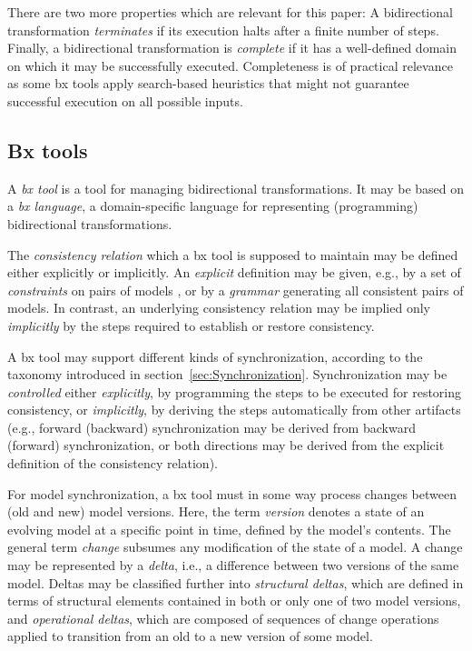 There are two more properties which are relevant for this paper: A bidirectional transformation \emph{terminates} if its execution halts after a finite number of steps. 
Finally, a bidirectional transformation is \emph{complete} if it has a well-defined domain on which it may be successfully executed.
Completeness is of practical relevance as some bx tools apply search-based heuristics that might not guarantee successful execution on all possible inputs.

\subsection{Bx tools}
\label{sec:BxTools}

A \emph{bx tool} is a tool for managing bidirectional transformations. It may be based on a \emph{bx language}, a domain-specific language for representing (programming) bidirectional transformations. 

The \emph{consistency relation} which a bx tool is supposed to maintain may be defined either explicitly or implicitly. An \emph{explicit} definition may be given, e.g., by a set of \emph{constraints} on pairs of models \cite{QVT-1.3}, or by a \emph{grammar} \cite{Schurr1994} generating all consistent pairs of models. 
In contrast, an underlying consistency relation may be implied only \emph{implicitly} by the steps required to establish or restore consistency.

A bx tool may support different kinds of synchronization, according to the taxonomy introduced in section~\ref{sec:Synchronization}. 
Synchronization may be \emph{controlled} either \emph{explicitly}, by programming the steps to be executed for restoring consistency, or \emph{implicitly}, by deriving the steps automatically from other artifacts (e.g., forward (backward) synchronization may be derived from backward (forward) synchronization, or both directions may be derived from the explicit definition of the consistency relation).

For model synchronization, a bx tool must in some way process changes between (old and new) model versions. Here, the term \emph{version} denotes a state of an evolving model at a specific point in time, defined by the model's contents. 
The general term \emph{change} subsumes any modification of the state of a model. 
A change may be represented by a \emph{delta}, i.e., a difference between two versions of the same model. 
Deltas may be classified further into \emph{structural deltas}, which are defined in terms of structural elements contained in both or only one of two model versions, and \emph{operational deltas}, which are composed of sequences of change operations applied to transition from an old to a new version of some model.

